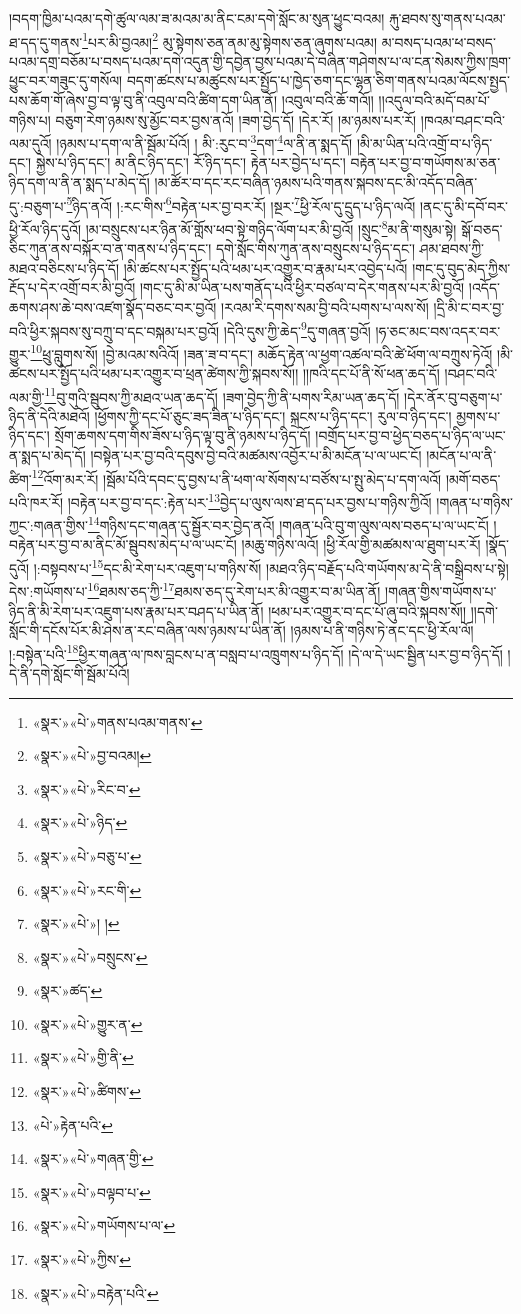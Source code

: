 །བདག་ཁྱིམ་པའམ་དགེ་ཚུལ་ལམ་ཟ་མའམ་མ་ནིང་ངམ་དགེ་སློང་མ་སུན་ཕྱུང་བའམ། རྐུ་ཐབས་སུ་གནས་པའམ་ཐ་དད་དུ་གནས་\footnote{«སྣར་»«པེ་»གནས་པའམ་གནས་}པར་མི་བྱའམ།\footnote{«སྣར་»«པེ་»བྱ་བའམ།} མུ་སྟེགས་ཅན་ནམ་མུ་སྟེགས་ཅན་ཞུགས་པའམ། མ་བསད་པའམ་ཕ་བསད་པའམ་དགྲ་བཅོམ་པ་བསད་པའམ་དགེ་འདུན་གྱི་དབྱེན་བྱས་པའམ་དེ་བཞིན་གཤེགས་པ་ལ་ངན་སེམས་ཀྱིས་ཁྲག་ཕྱུང་བར་གཟུང་དུ་གསོལ། བདག་ཚངས་པ་མཚུངས་པར་སྤྱོད་པ་ཁྱེད་ཅག་དང་ལྷན་ཅིག་གནས་པའམ་ལོངས་སྤྱད་པས་ཆོག་གོ་ཞེས་བྱ་བ་ལྟ་བུ་ནི་འབུལ་བའི་ཚིག་དག་ཡིན་ནོ། །འབུལ་བའི་ཆོ་གའོ།། །།འདུལ་བའི་མདོ་བམ་པོ་གཉིས་པ། བཅུག་རེག་ཉམས་སུ་མྱོང་བར་བྱས་ནའོ། །ཟག་བྱེད་དོ། །དེར་རོ། །མ་ཉམས་པར་རོ། །ཁའམ་བཤང་བའི་ལམ་དུའོ། །ཉམས་པ་དག་ལ་ནི་སྦོམ་པོའོ། །
མི་:རུང་བ་\footnote{«སྣར་»«པེ་»རིང་བ་}དག་\footnote{«སྣར་»«པེ་»ཉིད་}ལ་ནི་ན་སྨད་དོ། །མི་མ་ཡིན་པའི་འགྲོ་བ་པ་ཉིད་དང་། སྐྱེས་པ་ཉིད་དང་། མ་ནིང་ཉིད་དང་། རོ་ཉིད་དང་། རྟེན་པར་བྱེད་པ་དང་། བརྟེན་པར་བྱ་བ་གཡོགས་མ་ཅན་ཉིད་དག་ལ་ནི་ན་སྨད་པ་མེད་དོ། །མ་ཚོར་བ་དང་རང་བཞིན་ཉམས་པའི་གནས་སྐབས་དང་མི་འདོད་བཞིན་དུ་:བཅུག་པ་\footnote{«སྣར་»«པེ་»བཅུ་པ་}ཉིད་ནའོ། །:རང་གིས་\footnote{«སྣར་»«པེ་»རང་གི་}བརྟེན་པར་བྱ་བར་རོ། །སྔར་\footnote{«སྣར་»«པེ་»། །}ཕྱི་རོལ་དུ་དྲུད་པ་ཉིད་ལའོ། །ནང་དུ་མི་དབོ་བར་ཕྱི་རོལ་ཉིད་དུའོ། །མ་བསྲུངས་པར་ཉིན་མོ་གློས་ཕབ་སྟེ་གཉིད་ལོག་པར་མི་བྱའོ། །སྲུང་\footnote{«སྣར་»«པེ་»བསྲུངས་}མ་ནི་གསུམ་སྟེ། སྒོ་བཅད་ཅིང་ཀུན་ནས་བསྐོར་བ་ན་གནས་པ་ཉིད་དང་། དགེ་སློང་གིས་ཀུན་ནས་བསྲུངས་པ་ཉིད་དང་། ཤམ་ཐབས་ཀྱི་མཐའ་བཅིངས་པ་ཉིད་དོ། །མི་ཚངས་པར་སྤྱོད་པའི་ཕམ་པར་འགྱུར་བ་རྣམ་པར་འབྱེད་པའོ། །གང་དུ་བུད་མེད་ཀྱིས་རྔོད་པ་དེར་འགྲོ་བར་མི་བྱའོ། །གང་དུ་མི་མ་ཡིན་པས་གནོད་པའི་ཕྱིར་བཙལ་བ་དེར་གནས་པར་མི་བྱའོ། །འདོད་ཆགས་ཤས་ཆེ་བས་འཛག་སྣོད་བཅང་བར་བྱའོ། །རའམ་རི་དགས་སམ་བྱི་བའི་པགས་པ་ལས་སོ། །དྲི་མི་ང་བར་བྱ་བའི་ཕྱིར་སྐབས་སུ་བཀྲུ་བ་དང་བསྐམ་པར་བྱའོ། །དེའི་དུས་ཀྱི་ཆེད་\footnote{«སྣར་»ཚད་}དུ་གཞན་བྱའོ། །ཧ་ཅང་མང་བས་འདར་བར་གྱུར་\footnote{«སྣར་»«པེ་»གྱུར་ན་}ཕྲུ་བླུགས་སོ། །བྱེ་མའམ་སའིའོ། །ཟན་ཟ་བ་དང་། མཆོད་རྟེན་ལ་ཕྱག་འཚལ་བའི་ཚེ་ཕོག་ལ་བཀྲུས་ཏེའོ། །མི་ཚངས་པར་སྤྱོད་པའི་ཕམ་པར་འགྱུར་བ་ཕྲན་ཚེགས་ཀྱི་སྐབས་སོ།། །།ཁའི་དང་པོ་ནི་སོ་ཕན་ཆད་དོ། །བཤང་བའི་ལམ་གྱི་\footnote{«སྣར་»«པེ་»གྱི་ནི་}བུ་གུའི་སྦུབས་ཀྱི་མཐའ་ཡན་ཆད་དོ། །ཟག་བྱེད་ཀྱི་ནི་པགས་རིམ་ཡན་ཆད་དོ། །དེར་ནོར་བུ་བཅུག་པ་ཉིད་ནི་དེའི་མཐའོ། །ཕྱོགས་ཀྱི་དང་པོ་ཅུང་ཟད་ཟིན་པ་ཉིད་དང་། སྐྲངས་པ་ཉིད་དང་། རུལ་བ་ཉིད་དང་། མྱགས་པ་ཉིད་དང་། སྲོག་ཆགས་དག་གིས་ཟོས་པ་ཉིད་ལྟ་བུ་ནི་ཉམས་པ་ཉིད་དོ། །བགྲོད་པར་བྱ་བ་ཕྱེད་བཅད་པ་ཉིད་ལ་ཡང་ན་སྨད་པ་མེད་དོ། །བསྟེན་པར་བྱ་བའི་དབུས་བྱེ་བའི་མཚམས་འབྱོར་པ་མི་མངོན་པ་ལ་ཡང་ངོ། །མངོན་པ་ལ་ནི་ཚིག་\footnote{«སྣར་»«པེ་»ཚིགས་}འོག་མར་རོ། །སྦོམ་པོའི་དབང་དུ་བྱས་པ་ནི་ཕག་ལ་སོགས་པ་བཙོས་པ་སྤུ་མེད་པ་དག་ལའོ། །མགོ་བཅད་པའི་ཁར་རོ། །བརྟེན་པར་བྱ་བ་དང་:རྟེན་པར་\footnote{«པེ་»རྟེན་པའི་}བྱེད་པ་ལུས་ལས་ཐ་དད་པར་བྱས་པ་གཉིས་ཀྱིའོ། །གཞན་པ་གཉིས་ཀྱང་:གཞན་གྱིས་\footnote{«སྣར་»«པེ་»གཞན་གྱི་}གཉིས་དང་གཞན་དུ་སྦྱོར་བར་བྱེད་ནའོ། །གཞན་པའི་བུ་ག་ལུས་ལས་བཅད་པ་ལ་ཡང་ངོ། །བརྟེན་པར་བྱ་བ་མ་ནིང་མོ་སྦུབས་མེད་པ་ལ་ཡང་ངོ། །མཆུ་གཉིས་ལའོ། །ཕྱི་རོལ་གྱི་མཚམས་ལ་ཐུག་པར་རོ། །སྣོད་དུའོ། །:བསྟབས་པ་\footnote{«སྣར་»«པེ་»བལྟབ་པ་}དང་མི་རེག་པར་འཇུག་པ་གཉིས་སོ། །མཐའ་ཉིད་བརྗོད་པའི་གཡོགས་མ་དེ་ནི་བསྒྲིབས་པ་སྟེ། དེས་:གཡོགས་པ་\footnote{«སྣར་»«པེ་»གཡོགས་པ་ལ་}ཐམས་ཅད་ཀྱི་\footnote{«སྣར་»«པེ་»ཀྱིས་}ཐམས་ཅད་དུ་རེག་པར་མི་འགྱུར་བ་མ་ཡིན་ནོ། །གཞན་གྱིས་གཡོགས་པ་ཉིད་ནི་མི་རེག་པར་འཇུག་པས་རྣམ་པར་བཤད་པ་ཡིན་ནོ། །ཕམ་པར་འགྱུར་བ་དང་པོ་ཞུ་བའི་སྐབས་སོ།། །།དགེ་སློང་གི་དངོས་པོར་མི་ཤེས་ན་རང་བཞིན་ལས་ཉམས་པ་ཡིན་ནོ། །ཉམས་པ་ནི་གཉིས་ཏེ་ནང་དང་ཕྱི་རོལ་ལོ། །:བསྟེན་པའི་\footnote{«སྣར་»«པེ་»བརྟེན་པའི་}ཕྱིར་གཞན་ལ་ཁས་བླངས་པ་ན་བསླབ་པ་འཁྲུགས་པ་ཉིད་དོ། །དེ་ལ་དེ་ཡང་སྦྱིན་པར་བྱ་བ་ཉིད་དོ། །དེ་ནི་དགེ་སློང་གི་སྦོམ་པོའོ། 